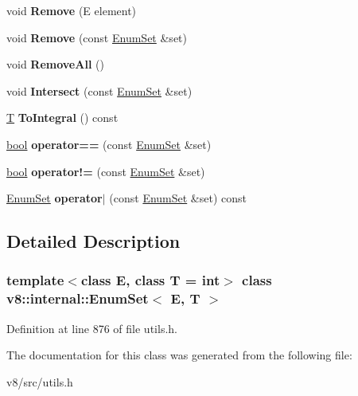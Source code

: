 \begin{DoxyCompactItemize}
void {\bfseries Remove} (E element)
\item 
\mbox{\label{classv8_1_1internal_1_1EnumSet_a06cae32ab5465dc2c5676c7ef2617e6a}} 
void {\bfseries Remove} (const \mbox{\hyperlink{classv8_1_1internal_1_1EnumSet}{Enum\+Set}} \&set)
\item 
\mbox{\label{classv8_1_1internal_1_1EnumSet_a43cbbc3281c551f18b3d156005272a34}} 
void {\bfseries Remove\+All} ()
\item 
\mbox{\label{classv8_1_1internal_1_1EnumSet_aa04525460c1a2f5967bd65979e8c29a7}} 
void {\bfseries Intersect} (const \mbox{\hyperlink{classv8_1_1internal_1_1EnumSet}{Enum\+Set}} \&set)
\item 
\mbox{\label{classv8_1_1internal_1_1EnumSet_a69cd970a915fef76defbf32ffbb8e28c}} 
\mbox{\hyperlink{classv8_1_1internal_1_1torque_1_1T}{T}} {\bfseries To\+Integral} () const
\item 
\mbox{\label{classv8_1_1internal_1_1EnumSet_a77b1d6ab479998ace55f445a9b517e09}} 
\mbox{\hyperlink{classbool}{bool}} {\bfseries operator==} (const \mbox{\hyperlink{classv8_1_1internal_1_1EnumSet}{Enum\+Set}} \&set)
\item 
\mbox{\label{classv8_1_1internal_1_1EnumSet_a8fa403add1ad907344e9f4f86abec24f}} 
\mbox{\hyperlink{classbool}{bool}} {\bfseries operator!=} (const \mbox{\hyperlink{classv8_1_1internal_1_1EnumSet}{Enum\+Set}} \&set)
\item 
\mbox{\label{classv8_1_1internal_1_1EnumSet_a2258e4e7d2aed6696849faca164857be}} 
\mbox{\hyperlink{classv8_1_1internal_1_1EnumSet}{Enum\+Set}} {\bfseries operator$\vert$} (const \mbox{\hyperlink{classv8_1_1internal_1_1EnumSet}{Enum\+Set}} \&set) const
\end{DoxyCompactItemize}


\subsection{Detailed Description}
\subsubsection*{template$<$class E, class T = int$>$\newline
class v8\+::internal\+::\+Enum\+Set$<$ E, T $>$}



Definition at line 876 of file utils.\+h.



The documentation for this class was generated from the following file\+:\begin{DoxyCompactItemize}
\item 
v8/src/utils.\+h\end{DoxyCompactItemize}
